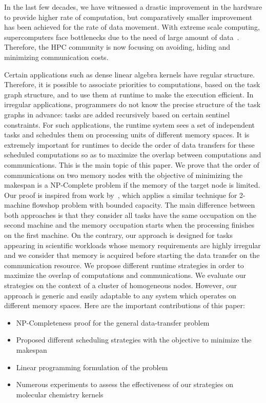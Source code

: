\documentclass[sigconf]{acmart}
\begin{document}
	
	In the last few decades, we have witnessed a drastic improvement in the hardware to provide higher rate of computation, but comparatively smaller improvement has been achieved for the rate of data movement. With extreme scale computing, supercomputers face bottlenecks due to the need of large amount of data~\cite{ascaccommitteereport2014,yelick2016}. Therefore, the HPC community is now focusing on avoiding, hiding and minimizing communication costs.
	
	
	Certain applications such as dense linear algebra kernels have regular structure. Therefore, it is possible to associate priorities to computations, based on the task graph structure, and to use them at runtime to make the execution efficient. In irregular applications, programmers do not know the precise structure of the task graphs in advance: tasks are added recursively based on certain sentinel constraints. For such applications, the runtime system sees a set of independent tasks and schedules them on processing units of different memory spaces. It is extremely important for runtimes to decide the order of data transfers for these scheduled computations so as to maximize the overlap between computations and communications. This is the main topic of this paper. We prove that the order of communications on two memory nodes with the objective of minimizing the makespan is a NP-Complete problem if the memory of the target node is limited. Our proof is inspired from work by~\cite{Papadimitriou:1980:FSL:322203.322213}, which applies a similar technique for 2-machine flowshop problem with bounded capacity. The main difference between both approaches is that they consider all tasks have the same occupation on the second machine and the memory occupation starts when the processing finishes on the first machine. On the contrary, our approach is designed for tasks appearing in scientific workloads whose memory requirements are highly irregular and we consider that memory is acquired before starting the data transfer on the communication resource. We propose different runtime strategies in order to maximize the overlap of computations and communications. We evaluate our strategies on the context of a cluster of homogeneous nodes. However, our approach is generic and easily adaptable to any system which operates on different memory spaces. Here are the important contributions of this paper:
	
	
	\renewcommand{\labelitemi}{$\bullet$}
	\begin{itemize}
		\item NP-Completeness proof for the general data-transfer problem 
		\item Proposed different scheduling strategies with the objective to minimize the makespan
		\item Linear programming formulation of the problem
		\item Numerous experiments to assess the effectiveness of our strategies on molecular chemistry kernels 
	\end{itemize}
	
\end{document}
